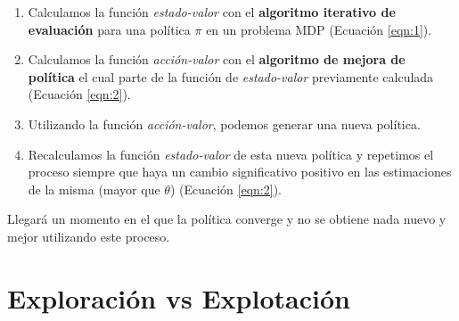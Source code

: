\documentclass[11pt,fleqn]{book} %
\begin{document}
\begin{enumerate}
	\item Calculamos la función \textit{estado-valor} con el \textbf{algoritmo iterativo de evaluación} para una política $\pi$ en un problema MDP (Ecuación \ref{eqn:1}). \\
	
	\item Calculamos la función \textit{acción-valor} con el \textbf{algoritmo de mejora de política} el cual parte de la función de \textit{estado-valor} previamente calculada (Ecuación \ref{eqn:2}).\\
	
	\item Utilizando la función \textit{acción-valor}, podemos generar una nueva política. \\
	
	\item Recalculamos la función \textit{estado-valor} de esta nueva política y repetimos el proceso siempre que haya un cambio significativo positivo en las estimaciones de la misma (mayor que $\theta$) (Ecuación \ref{eqn:2}). \\	
\end{enumerate}

Llegará un momento en el que la política converge y no se obtiene nada nuevo y mejor utilizando este proceso.

\section{Exploración vs Explotación}\label{sec:probabilidades}



\end{document}
